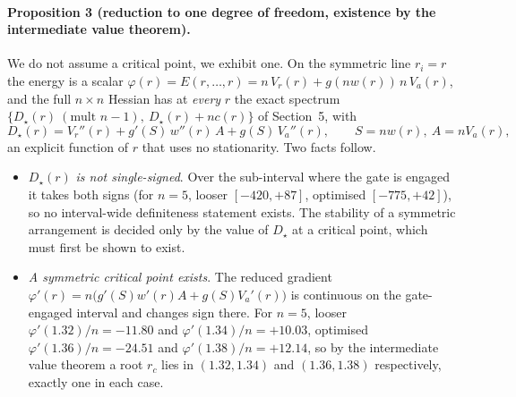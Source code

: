 \documentclass[11pt]{article}
\begin{document}
\paragraph{Proposition 3 (reduction to one degree of freedom, existence by the intermediate value theorem).}
We do not assume a critical point, we exhibit one. On the symmetric line $r_i=r$ the energy is
a scalar $\varphi(r)=E(r,\dots,r)=n\,V_r(r)+g(nw(r))\,n\,V_a(r)$, and the full $n\times n$
Hessian has at \emph{every} $r$ the exact spectrum $\{D_\star(r)\ (\text{mult }n-1),\
D_\star(r)+nc(r)\}$ of Section~5, with
\[
D_\star(r)=V_r''(r)+g'(S)\,w''(r)\,A+g(S)\,V_a''(r),\qquad S=nw(r),\ A=nV_a(r),
\]
an explicit function of $r$ that uses no stationarity. Two facts follow.
\begin{itemize}
\item $D_\star(r)$ \emph{is not single-signed}. Over the sub-interval where the gate is
      engaged it takes both signs (for $n=5$, looser $[-420,+87]$, optimised $[-775,+42]$), so
      no interval-wide definiteness statement exists. The stability of a symmetric arrangement
      is decided only by the value of $D_\star$ at a critical point, which must first be shown
      to exist.
\item \emph{A symmetric critical point exists}. The reduced gradient
      $\varphi'(r)=n\bigl(g'(S)w'(r)A+g(S)V_a'(r)\bigr)$ is continuous on the gate-engaged
      interval and changes sign there. For $n=5$, looser
      $\varphi'(1.32)/n=-11.80$ and $\varphi'(1.34)/n=+10.03$, optimised
      $\varphi'(1.36)/n=-24.51$ and $\varphi'(1.38)/n=+12.14$, so by the intermediate value
      theorem a root $r_c$ lies in $(1.32,1.34)$ and $(1.36,1.38)$ respectively, exactly one in
      each case.
\end{itemize}
\end{document}
